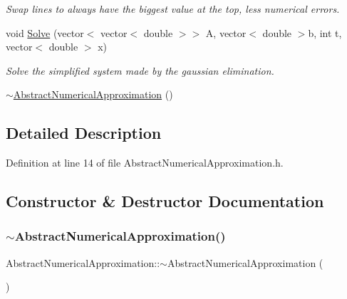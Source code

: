 \begin{DoxyCompactItemize}
\begin{DoxyCompactList}\small\item\em Swap lines to always have the biggest value at the top, less numerical errors. \end{DoxyCompactList}\item 
void \mbox{\hyperlink{class_abstract_numerical_approximation_adbbdee2940b7181abd9d8e968dea8927}{Solve}} (vector$<$ vector$<$ double $>$$>$ A, vector$<$ double $>$b, int t, vector$<$ double $>$ x)
\begin{DoxyCompactList}\small\item\em Solve the simplified system made by the gaussian elimination. \end{DoxyCompactList}\item 
\mbox{\hyperlink{class_abstract_numerical_approximation_a358054cadc54f5d0c7891505da040783}{$\sim$\+Abstract\+Numerical\+Approximation}} ()
\end{DoxyCompactItemize}


\subsection{Detailed Description}


Definition at line 14 of file Abstract\+Numerical\+Approximation.\+h.



\subsection{Constructor \& Destructor Documentation}
\mbox{\label{class_abstract_numerical_approximation_a358054cadc54f5d0c7891505da040783}} 
\subsubsection{\texorpdfstring{$\sim$\+Abstract\+Numerical\+Approximation()}{~AbstractNumericalApproximation()}}
{\footnotesize\ttfamily Abstract\+Numerical\+Approximation\+::$\sim$\+Abstract\+Numerical\+Approximation (\begin{DoxyParamCaption}{ }\end{DoxyParamCaption})}




